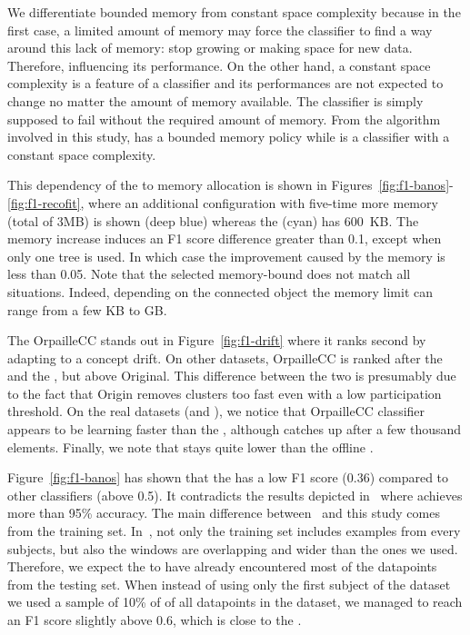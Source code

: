 We differentiate bounded memory from constant space complexity because in the
first case, a limited amount of memory may force the classifier to find a way
around this lack of memory: stop growing or making space for new data.
Therefore, influencing its performance.  On the other hand, a constant space
complexity is a feature of a classifier and its performances are not expected
to change no  matter the amount of memory available. The classifier is simply
supposed to fail without the required amount of memory. From the algorithm
involved in this study, \mondrianforest has a bounded memory policy while
\naivebayes is a classifier with a constant space complexity.

This dependency of the \mondrianforest to memory allocation is shown in
Figures~\ref{fig:f1-banos}-\ref{fig:f1-recofit}, where an additional
configuration with five-time more memory (total of 3MB) is shown (deep blue)
whereas the \mondrianforest (cyan) has 600~KB.  The memory increase induces an
F1 score difference greater than 0.1, except when only one tree is used. In
which case the improvement caused by the memory is less than 0.05. Note that the
selected memory-bound does not match all situations. Indeed, depending on
the connected object the memory limit can range from a few KB to GB.

The \mcnn OrpailleCC stands out in Figure~\ref{fig:f1-drift} where it ranks
second by adapting to a concept drift.  On other datasets, \mcnn OrpailleCC is
ranked after the \mondrianforest and the \hoeffdingtree, but above \mcnn
Original. This difference between the two \mcnns is presumably due to the fact
that \mcnn Origin removes clusters too fast even with a low participation
threshold.  On the real datasets (\banosdataset and \recofitdataset), we notice
that \mcnn OrpailleCC classifier appears to be learning faster than the
\mondrianforest, although \mondrianforest catches up after a few thousand
elements. Finally, we note that \mcnn stays quite lower than the offline \knn.

Figure~\ref{fig:f1-banos} has shown that the \FNN has a low F1 score (0.36)
compared to other classifiers (above 0.5). It contradicts the results depicted
in~\cite{omid_2019} where \FNN achieves more than 95\% accuracy. The main
difference between~\cite{omid_2019} and this study comes from the training set.
In~\cite{omid_2019}, not only the training set includes examples from every
subjects, but also the windows are overlapping and wider than the ones we used.
Therefore, we expect the \FNN to have already encountered most of the datapoints
from the testing set. When instead of using only the first subject of the
\banosdataset dataset we used a sample of 10\% of of all datapoints in the
\banosdataset dataset, we managed to reach an F1 score slightly above 0.6, which
is close to the \naivebayes.

